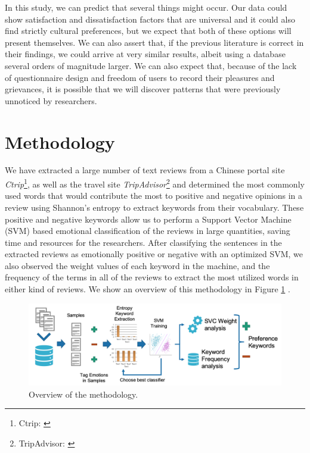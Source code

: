 In this study, we can predict that several things might occur. Our data could show satisfaction and dissatisfaction factors that are universal and it could also find strictly cultural preferences, but we expect that both of these options will present themselves. We can also assert that, if the previous literature is correct in their findings, we could arrive at very similar results, albeit using a database several orders of magnitude larger. We can also expect that, because of the lack of questionnaire design and freedom of users to record their pleasures and grievances, it is possible that we will discover patterns that were previously unnoticed by researchers.

\section{Methodology}\label{method}

We have extracted a large number of text reviews from a Chinese portal site \textit{Ctrip}\footnote{\label{ctrip}Ctrip: \href {www.ctrip.com/}{}}, as well as the travel site \textit{TripAdvisor}\footnote{\label{tripadvisor}TripAdvisor: \href {www.tripadvisor.com/}{}} and determined the most commonly used words that would contribute the most to positive and negative opinions in a review using Shannon's entropy to extract keywords from their vocabulary. These positive and negative keywords allow us to perform a Support Vector Machine (SVM) based emotional classification of the reviews in large quantities, saving time and resources for the researchers. After classifying the sentences in the extracted reviews as emotionally positive or negative with an optimized SVM, we also observed the weight values of each keyword in the machine, and the frequency of the terms in all of the reviews to extract the most utilized words in either kind of reviews. We show an overview of this methodology in Figure \ref{fig:method-overview} \cite[][]{Aleman2018ICAROB}.

\begin{figure}[bp]
\centering
\includegraphics[width=\textwidth]{emotion-method-overview.png}
\caption{Overview of the methodology.}
\label{fig:method-overview}
\end{figure}

